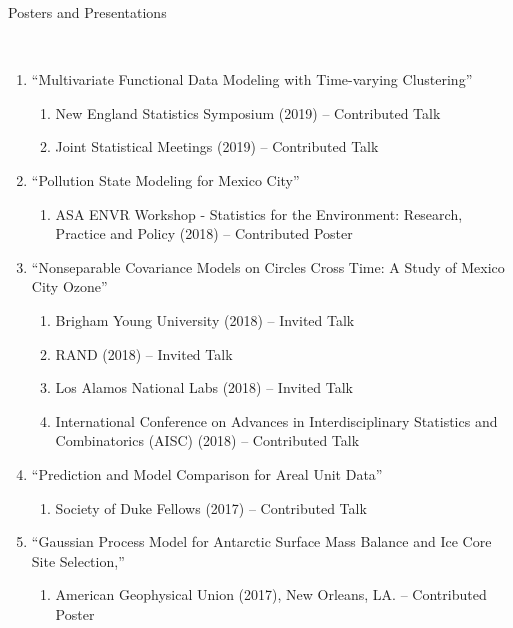 \documentclass[11pt]{article}
\newcommand{\head}[1]{ %
    \bigskip %
    \begin{large}\begin{bf}{#1}\end{bf}\end{large} %

    \ \\ [-1.3cm] %

    \hrulefill}
\begin{document}
\head{Posters and Presentations}

\begin{enumerate}[label=$\bullet$]
\item ``Multivariate Functional Data Modeling with Time-varying Clustering''
\begin{enumerate}[label=$\cdot$]
\item New England Statistics Symposium (2019) -- Contributed Talk
\item Joint Statistical Meetings (2019) -- Contributed Talk
\end{enumerate}
\item ``Pollution State Modeling for Mexico City''
\begin{enumerate}[label=$\cdot$]
\item ASA ENVR Workshop - Statistics for the Environment: Research, Practice and Policy (2018) -- Contributed Poster
\end{enumerate}
\item ``Nonseparable Covariance Models on Circles Cross Time: A Study of Mexico City Ozone''
\begin{enumerate}[label=$\cdot$]
\item Brigham Young University (2018) -- Invited Talk
\item RAND (2018) -- Invited Talk
\item Los Alamos National Labs (2018) -- Invited Talk
\item International Conference on Advances in Interdisciplinary Statistics and Combinatorics (AISC) (2018) -- Contributed Talk
\end{enumerate}
\item ``Prediction and Model Comparison for Areal Unit Data''
\begin{enumerate}[label=$\cdot$]
\item Society of Duke Fellows (2017) -- Contributed Talk
\end{enumerate}
\item  ``Gaussian Process Model for Antarctic Surface Mass Balance and Ice Core Site Selection,'' 
\begin{enumerate}[label=$\cdot$]
\item American Geophysical Union (2017), New Orleans, LA. -- Contributed Poster

\end{enumerate}
\end{enumerate}
\end{document}
